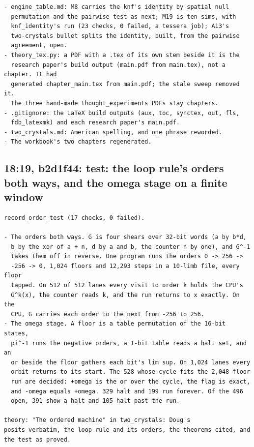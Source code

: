 \begin{Verbatim}
- engine_table.md: M8 carries the knf's identity by spatial null
  permutation and the pairwise test as next; M19 is ten sims, with
  knf_identity's run (23 checks, 0 failed, a tessera job); A13's
  two-crystals bullet splits the identity, built, from the pairwise
  agreement, open.
- theory_tex.py: a PDF with a .tex of its own stem beside it is the
  research paper's build output (main.pdf from main.tex), not a chapter. It had
  generated chapter_main.tex from main.pdf; the stale sweep removed it.
  The three hand-made thought_experiments PDFs stay chapters.
- .gitignore: the LaTeX build outputs (aux, toc, synctex, out, fls,
  fdb_latexmk) and each research paper's main.pdf.
- two_crystals.md: American spelling, and one phrase reworded.
- The workbook's two chapters regenerated.
\end{Verbatim}

\subsection{\texorpdfstring{18:19, b2d1f44: test: the loop rule's orders both ways, and the omega stage on a finite window}{18:19, b2d1f44: test: the loop rule's orders both ways, and the omega stage on a finite window}}

\begin{Verbatim}
record_order_test (17 checks, 0 failed).

- The orders both ways. G is four shears over 32-bit words (a by b*d,
  b by the xor of a + n, d by a and b, the counter n by one), and G^-1
  takes them off in reverse. One program runs the orders 0 -> 256 ->
  -256 -> 0, 1,024 floors and 12,293 steps in a 10-limb file, every floor
  tapped. On 512 of 512 lanes every visit to order k holds the CPU's
  G^k(x), the counter reads k, and the run returns to x exactly. On the
  CPU, G carries each order to the next from -256 to 256.
- The omega stage. A floor is a table permutation of the 16-bit states,
  pi^-1 runs the negative orders, a 1-bit table reads a halt set, and an
  or beside the floor gathers each bit's lim sup. On 1,024 lanes every
  orbit returns to its start. The 528 whose cycle fits the 2,048-floor
  run are decided: +omega is the or over the cycle, the flag is exact,
  and -omega equals +omega. 329 halt and 199 run forever. Of the 496
  open, 391 show a halt and 105 halt past the run.

theory: "The ordered machine" in two_crystals: Doug's
posits verbatim, the loop rule and its orders, the theorems cited, and
the test as proved.
\end{Verbatim}


